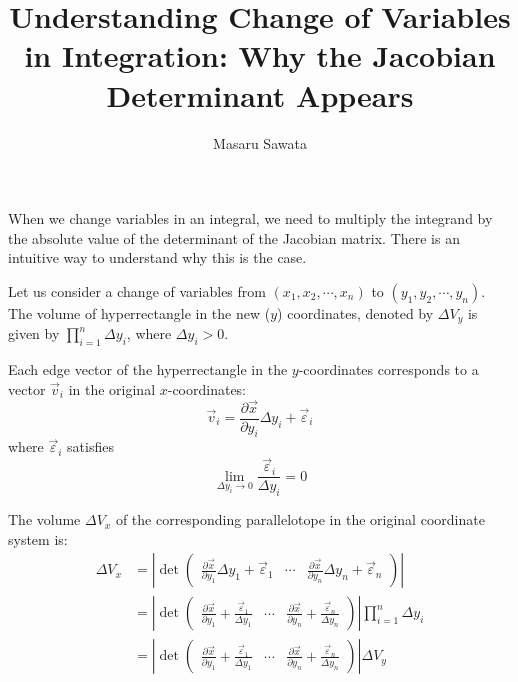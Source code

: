\documentclass[letterpaper, 12pt]{article}
\title{Understanding Change of Variables in Integration: Why the Jacobian Determinant Appears}
\author{Masaru Sawata}
\theoremstyle{custom}
\begin{document}
\maketitle

When we change variables in an integral, we need to multiply the integrand by the absolute value of the determinant of the Jacobian matrix.
There is an intuitive way to understand why this is the case.

Let us consider a change of variables from $(x_1, x_2, \cdots , x_n)$ to $(y_1, y_2, \cdots , y_n)$.
The volume of hyperrectangle in the new ($y$) coordinates, denoted by $\Delta V_y$ is given by $\displaystyle \prod_{i=1}^n \Delta y_i$, where $\Delta y_i > 0$.

Each edge vector of the hyperrectangle in the $y$-coordinates corresponds to a vector $\vec{v}_i$ in the original $x$-coordinates:
\begin{equation*}
  \vec{v}_i = \frac{\partial \vec{x}}{\partial y_i} \Delta y_i + \vec{\varepsilon}_i
\end{equation*}
where $\vec{\varepsilon}_i$ satisfies
\begin{equation*}  
  \lim_{\Delta y_i \rightarrow 0} \frac{\vec{\varepsilon}_i}{\Delta y_i} = 0
\end{equation*}

The volume $\Delta V_x$ of the corresponding parallelotope in the original coordinate system is:
\begin{align*}
  \Delta V_x &= \left| \det
  \begin{pmatrix}
    \displaystyle \frac{\partial \vec{x}}{\partial y_1} \Delta y_1 + \vec{\varepsilon}_1 & \cdots & \displaystyle \frac{\partial \vec{x}}{\partial y_n} \Delta y_n + \vec{\varepsilon}_n
  \end{pmatrix}\right| \\
  &=\left| \det 
  \begin{pmatrix}
    \displaystyle \frac{\partial \vec{x}}{\partial y_1} + \frac{\vec{\varepsilon}_1}{\Delta y_1} & \cdots & \displaystyle \frac{\partial \vec{x}}{\partial y_n} + \frac{\vec{\varepsilon}_n}{\Delta y_n} 
  \end{pmatrix}\right|
  \prod_{i=1}^n \Delta y_i \\
  &= \left| \det \begin{pmatrix}
    \displaystyle \frac{\partial \vec{x}}{\partial y_1} + \frac{\vec{\varepsilon}_1}{\Delta y_1} & \cdots & \displaystyle \frac{\partial \vec{x}}{\partial y_n} + \frac{\vec{\varepsilon}_n}{\Delta y_n} 
  \end{pmatrix}\right| \Delta V_y
\end{align*}
\end{document}
